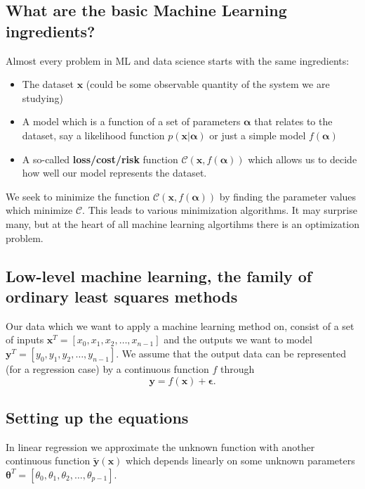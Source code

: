 \documentclass[%
oneside,                 %
final,                   %
10pt]{article}
\begin{document}
\subsection{What are the basic Machine Learning ingredients?}
\begin{block}{}
Almost every problem in ML and data science starts with the same ingredients:
\begin{itemize}
\item The dataset $\bm{x}$ (could be some observable quantity of the system we are studying)

\item A model which is a function of a set of parameters $\bm{\alpha}$ that relates to the dataset, say a likelihood  function $p(\bm{x}\vert \bm{\alpha})$ or just a simple model $f(\bm{\alpha})$

\item A so-called \textbf{loss/cost/risk} function $\mathcal{C} (\bm{x}, f(\bm{\alpha}))$ which allows us to decide how well our model represents the dataset. 
\end{itemize}

\noindent
We seek to minimize the function $\mathcal{C} (\bm{x}, f(\bm{\alpha}))$ by finding the parameter values which minimize $\mathcal{C}$. This leads to  various minimization algorithms. It may surprise many, but at the heart of all machine learning algortihms there is an optimization problem. 
\end{block}

\subsection{Low-level machine learning, the family of ordinary least squares methods}

Our data which we want to apply a machine learning method on, consist
of a set of inputs $\bm{x}^T=[x_0,x_1,x_2,\dots,x_{n-1}]$ and the
outputs we want to model $\bm{y}^T=[y_0,y_1,y_2,\dots,y_{n-1}]$.
We assume  that the output data can be represented (for a regression case) by a continuous function $f$
through
\[
\bm{y}=f(\bm{x})+\bm{\epsilon}.
\]

\subsection{Setting up the equations}

In linear regression we approximate the unknown function with another
continuous function $\tilde{\bm{y}}(\bm{x})$ which depends linearly on
some unknown parameters
$\bm{\theta}^T=[\theta_0,\theta_1,\theta_2,\dots,\theta_{p-1}]$.
\end{document}
